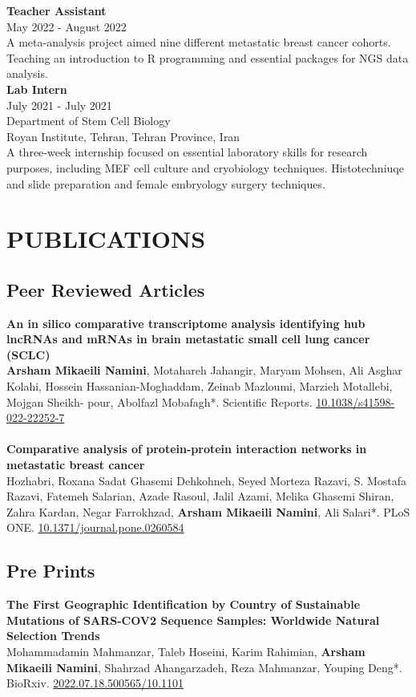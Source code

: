 \documentclass[a4paper,9pt]{extarticle}
\begin{document}
\noindent
\textbf{Teacher Assistant} \\
May 2022 - August 2022 \\
A meta-analysis project aimed nine different metastatic breast cancer cohorts.
Teaching an introduction to R programming and essential packages for NGS data analysis.\\

\noindent
\textbf{Lab Intern} \\
July 2021 - July 2021 \\
Department of Stem Cell Biology  \\
Royan Institute, Tehran, Tehran Province, Iran\\
A three-week internship focused on essential laboratory skills for research purposes, including MEF cell culture and cryobiology techniques. Histotechniuqe and slide preparation and female embryology surgery techniques. 


\section*{PUBLICATIONS}
 
\subsection*{Peer Reviewed Articles}
\textbf{An in silico comparative transcriptome analysis identifying hub lncRNAs and mRNAs in brain metastatic small cell lung cancer (SCLC)} \\ 
\textbf{Arsham Mikaeili Namini}, Motahareh Jahangir, Maryam Mohsen, Ali Asghar Kolahi, Hossein Hassanian-Moghaddam, Zeinab Mazloumi, Marzieh Motallebi, Mojgan Sheikh- pour, Abolfazl Mobafagh*. Scientific Reports.  \href{https://www.nature.com/articles/s41598-022-22252-7}{10.1038/s41598-022-22252-7}\\
\\
\textbf{Comparative analysis of protein-protein interaction networks in metastatic breast cancer} \\ 
Hozhabri, Roxana Sadat Ghasemi Dehkohneh, Seyed Morteza Razavi, S. Mostafa Razavi, Fatemeh Salarian, Azade Rasoul, Jalil Azami, Melika Ghasemi Shiran, Zahra Kardan, Negar Farrokhzad, \textbf{Arsham Mikaeili Namini}, Ali Salari*. PLoS ONE. \href{https://doi.org/10.1371/journal.pone.0260584}{10.1371/journal.pone.0260584}

\subsection*{Pre Prints}
\textbf{The First Geographic Identification by Country of Sustainable Mutations of SARS-COV2 Sequence Samples: Worldwide Natural Selection Trends} \\
Mohammadamin Mahmanzar, Taleb Hoseini, Karim Rahimian, \textbf{Arsham Mikaeili Namini}, Shahrzad Ahangarzadeh, Reza Mahmanzar, Youping Deng*. BioRxiv. \href{https://doi.org/10.1101/2022.07.18.500565}{2022.07.18.500565/10.1101}
\end{document}
